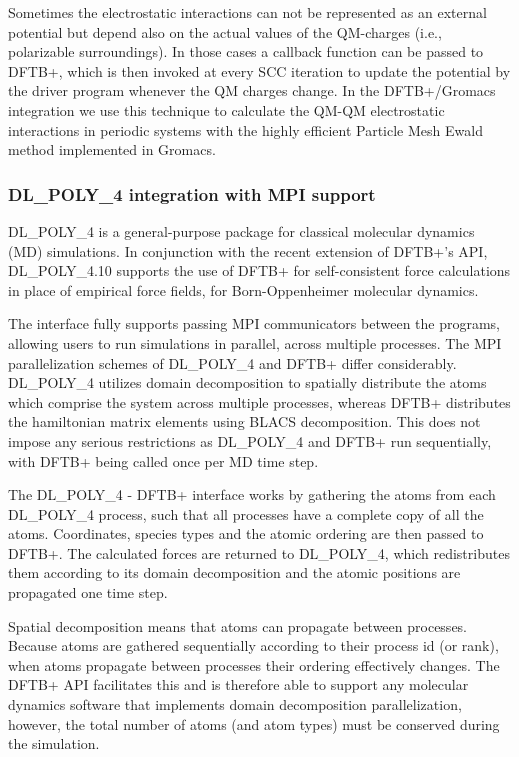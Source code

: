 \documentclass[reprint,onecolumn,superscriptaddress]{revtex4-1}
\newcommand{\dftbp}{DFTB+}
\begin{document}
Sometimes the electrostatic interactions can not be represented as an external
potential but depend also on the actual values of the QM-charges (i.e.,
polarizable surroundings). In those cases a callback function can be
passed to \dftbp{}, which is then invoked at every SCC iteration to update the
potential by the driver program whenever the QM charges
change. In the \dftbp{}/Gromacs integration we use this technique to calculate
the QM-QM electrostatic interactions in periodic systems with the highly
efficient Particle Mesh Ewald method\cite{Darden1993} implemented in Gromacs.

\subsubsection{DL\_POLY\_4 integration with MPI support}

DL\_POLY\_4 is a general-purpose package for classical molecular dynamics (MD)
simu\-la\-tions.\cite{dl_poly2006} In conjunction with the recent extension of
\dftbp{}'s API, DL\_POLY\_4.10 supports the use of \dftbp{} for self-consistent
force calculations in place of empirical force fields, for Born-Oppenheimer
molecular dynamics.

The interface fully supports passing MPI communicators between the programs,
allowing users to run simulations in parallel, across multiple processes. The
MPI parallelization schemes of DL\_POLY\_4 and \dftbp{} differ
considerably. DL\_POLY\_4 utilizes domain decomposition to spatially distribute
the atoms which comprise the system across multiple processes, whereas \dftbp{}
distributes the hamiltonian matrix elements using BLACS decomposition. This does
not impose any serious restrictions as DL\_POLY\_4 and \dftbp{} run
sequentially, with \dftbp{} being called once per MD time step.

The DL\_POLY\_4 - \dftbp{} interface works by gathering the atoms from each
DL\_POLY\_4 process, such that all processes have a complete copy of all the
atoms. Coordinates, species types and the atomic ordering are then passed to
\dftbp{}.  The calculated forces are returned to DL\_POLY\_4, which
redistributes them according to its domain decomposition and the atomic
positions are propagated one time step.

Spatial decomposition means that atoms can propagate between processes. Because
atoms are gathered sequentially according to their process id (or rank), when
atoms propagate between processes their ordering effectively changes. The
\dftbp{} API facilitates this and is therefore able to support any molecular
dynamics software that implements domain decomposition parallelization, however,
the total number of atoms (and atom types) must be conserved during the
simulation.
\end{document}
